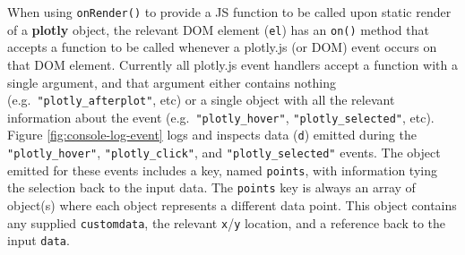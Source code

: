 \documentclass[
  12pt,
]{krantz}
\newenvironment{Shaded}{\begin{snugshade}}{\end{snugshade}}
\newcommand{\DataTypeTok}[1]{\textcolor[rgb]{0.13,0.29,0.53}{#1}}
\newcommand{\KeywordTok}[1]{\textcolor[rgb]{0.13,0.29,0.53}{\textbf{#1}}}
\newcommand{\NormalTok}[1]{#1}
\newcommand{\OperatorTok}[1]{\textcolor[rgb]{0.81,0.36,0.00}{\textbf{#1}}}
\newcommand{\StringTok}[1]{\textcolor[rgb]{0.31,0.60,0.02}{#1}}
\begin{document}
When using \texttt{onRender()} to provide a JS function to be called upon static render of a \textbf{plotly} object, the relevant DOM element (\texttt{el}) has an \texttt{on()} method that accepts a function to be called whenever a plotly.js (or DOM) event occurs on that DOM element. Currently all plotly.js event handlers accept a function with a single argument, and that argument either contains nothing (e.g.~\texttt{"plotly\_afterplot"}, etc) or a single object with all the relevant information about the event (e.g.~\texttt{"plotly\_hover"}, \texttt{"plotly\_selected"}, etc). Figure \ref{fig:console-log-event} logs and inspects data (\texttt{d}) emitted during the \texttt{"plotly\_hover"}, \texttt{"plotly\_click"}, and \texttt{"plotly\_selected"} events. The object emitted for these events includes a key, named \texttt{points}, with information tying the selection back to the input data. The \texttt{points} key is always an array of object(s) where each object represents a different data point. This object contains any supplied \texttt{customdata}, the relevant \texttt{x}/\texttt{y} location, and a reference back to the input \texttt{data}.


\begin{Shaded}
\end{Shaded}
\end{document}
